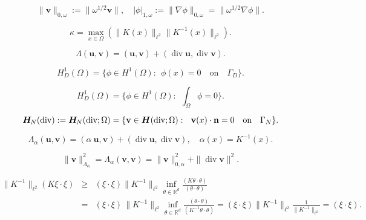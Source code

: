 \documentclass[11pt]{article}
\begin{document}
\[
\|{{\mathbf v}}\|_{0,\omega} := 
\|\omega^{1/2}{{\mathbf v}}\|, \quad
|\phi|_{1,\omega}:= \|\nabla \phi\|_{0,\omega} =\|\omega^{1/2}\nabla \phi\|.
\]

\begin{equation}\label{contrast}
\kappa = \max_{x \in \Omega} (\|K(x)\|_{\ell^2}\|K^{-1}(x)\|_{\ell^2}). 
\end{equation}

\begin{equation}\label{H-div-prod}
\Lambda({{\mathbf u}}, {{\mathbf v}})= ({{\mathbf u}},{{\mathbf v}}) + ({\operatorname{div}} {{\mathbf u}}, {\operatorname{div}} {{\mathbf v}}).
\end{equation}

\begin{equation}\label{H-D}
H^1_D({{\Omega}}) = \{ \phi \in H^1({{\Omega}}): ~~\phi(x)=0 \quad \text{on} \quad \Gamma_D\}.
\end{equation}

\begin{equation}\label{H-D-2}
H^1_D({{\Omega}}) = \{ \phi \in H^1({{\Omega}}): ~~\int_{\Omega}\phi=0\}.
\end{equation}

\begin{equation}\label{H-N}
  {{\boldsymbol H}_{\hspace{-0.2mm}N}}({\operatorname{div}}) 
:= {{\boldsymbol H}_{\hspace{-0.2mm}N}}({\operatorname{div}}; {{\Omega}})= \{ {{\mathbf v}} \in {{\boldsymbol H}}({\operatorname{div}}; {{\Omega}}): ~~{{\mathbf v}}(x) \cdot {{\mathbf n}}=0 \quad \text{on} \quad \Gamma_N\}.
\end{equation}

\begin{equation}\label{WH-div-prod}
\Lambda_{{\alpha}}({{\mathbf u}}, {{\mathbf v}})= ({{\alpha}}~{{\mathbf u}},{{\mathbf v}}) + ({\operatorname{div}} {{\mathbf u}}, {\operatorname{div}} {{\mathbf v}}), 
\quad \alpha(x) = K^{-1}(x).
\end{equation}

\[
\|{{\mathbf v}}\|^2_{\Lambda_\alpha}  = 
\Lambda_{{\alpha}}({{\mathbf v}}, {{\mathbf v}})= 
\|{{\mathbf v}}\|^2_{0,\alpha} + \|{\operatorname{div}} {{\mathbf v}}\|^2.
\]

\begin{eqnarray*}
\|K^{-1}\|_{\ell^2}(K\xi\cdot\xi)& \ge &
(\xi\cdot\xi)\|K^{-1}\|_{\ell^2}
\inf_{\theta\in \mathbb{R}^d}\frac{(K\theta\cdot \theta)}{(\theta\cdot\theta)}\\
&= &
(\xi\cdot\xi) \, \|K^{-1}\|_{\ell^2}
\inf_{\theta\in
  \mathbb{R}^d}\frac{(\theta\cdot\theta)}{(K^{-1}\theta\cdot\theta)}
=
(\xi\cdot\xi)\|K^{-1}\|_{\ell^2}\frac{1}{\|K^{-1}\|_{\ell^2}}=(\xi\cdot\xi).
\end{eqnarray*}
\end{document}
